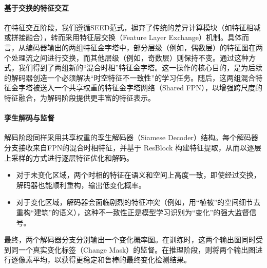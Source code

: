 \paragraph{基于交换的特征交互}
在特征交互阶段，我们遵循SEED范式，摒弃了传统的差异计算模块（如特征相减或拼接融合），转而采用特征层交换（Feature Layer Exchange）机制。具体而言，从编码器输出的两组特征金字塔中，部分层级（例如，偶数层）的特征图在两个处理流之间进行交换，而其他层级（例如，奇数层）则保持不变。通过这种方式，我们得到了两组新的“混合时相”特征金字塔。这一操作的核心目的，是为后续的解码器创造一个必须解决“时空特征不一致性”的学习任务。随后，这两组混合特征金字塔被送入一个共享权重的特征金字塔网络（Shared FPN），以增强跨尺度的特征融合，为解码阶段提供更丰富的特征表示。

\paragraph{孪生解码与监督}
解码阶段同样采用共享权重的孪生解码器（Siamese Decoder）结构。每个解码器分支接收来自FPN的混合时相特征，并基于 ResBlock 构建特征提取，从而以逐层上采样的方式进行逐层特征优化和解码。
\begin{itemize}
    \item 对于未变化区域，两个时相的特征在语义和空间上高度一致，即使经过交换，解码器也能顺利重构，输出低变化概率。
    \item 对于变化区域，解码器会面临剧烈的特征冲突（例如，用“植被”的空间细节去重构“建筑”的语义），这种不一致性正是模型学习识别为“变化”的强大监督信号。
\end{itemize}
最终，两个解码器分支分别输出一个变化概率图。在训练时，这两个输出图同时受到同一个真实变化标签（Change Mask）的监督。在推理阶段，则将两个输出图进行逐像素平均，以获得更稳定和鲁棒的最终变化检测结果。



